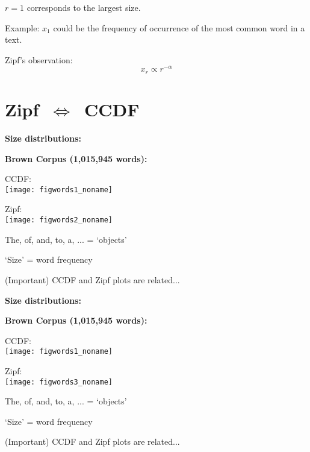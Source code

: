     $r=1$ corresponds to the largest size.
   
    Example: $x_1$ could be the frequency of occurrence of
    the most common word in a text.
  
    Zipf's observation:
    $$ x_r \propto r^{-\alpha} $$
  
  


\section{Zipf\ \texorpdfstring{$\Leftrightarrow$}{is\ equivalent\ to}\ CCDF}

  \textbf{Size distributions:}

  \textbf{Brown Corpus (1,015,945 words):}
    \medskip
          
      
      CCDF:\\
      \texttt{[image: figwords1\_noname]}
      
      Zipf:\\
      \texttt{[image: figwords2\_noname]}
      
      

  
    
     
      The, of, and, to, a, ...  = `objects'
     
      `Size' = word frequency
    
      {
         (Important) CCDF and Zipf plots are related...}
    
  


  \textbf{Size distributions:}

  \textbf{Brown Corpus (1,015,945 words):}
          
      
      CCDF:\\
      \texttt{[image: figwords1\_noname]}
      
      Zipf:\\
      \texttt{[image: figwords3\_noname]}
      
    
  

  
    
     
      The, of, and, to, a, ...  = `objects'
     
      `Size' = word frequency
    
      {
         (Important) CCDF and Zipf plots are related...}
    
  



